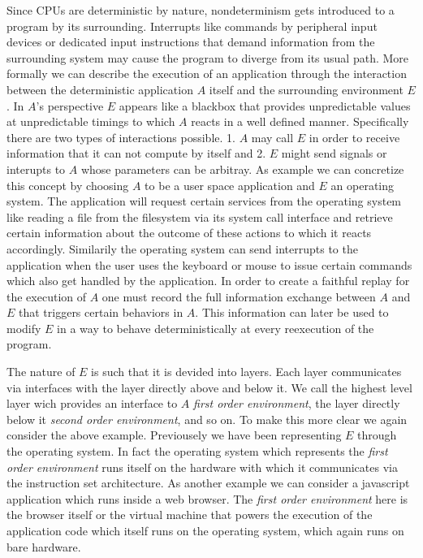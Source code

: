 \documentclass[11pt,a4paper]{book}
\begin{document}
Since CPUs are deterministic by nature, nondeterminism gets introduced to a
program by its surrounding. Interrupts like commands by peripheral input
devices or dedicated input instructions that demand information from the
surrounding system may cause the program to diverge from its usual path.
More formally we can describe the execution of an application through the
interaction between the deterministic application $A$ itself and the surrounding
environment $E$. In $A$'s perspective $E$ appears like a blackbox that
provides unpredictable values at unpredictable timings to which $A$ reacts
in a well defined manner. Specifically there are two types of interactions
possible. 1. $A$ may call $E$ in order to receive information that it can
not compute by itself and 2. $E$ might send signals or interupts to $A$
whose parameters can be arbitray. As example we can concretize this concept
by choosing $A$ to be a user space application and $E$ an operating system.
The application will request certain services from the operating system like
reading a file from the filesystem via its system call interface and retrieve
certain information about the outcome of these actions to which it reacts
accordingly. Similarily the operating system can send interrupts to the
application when the user uses the keyboard or mouse to issue certain commands
which also get handled by the application. In order to create a faithful
replay for the execution of $A$ one must record the full information exchange
between $A$ and $E$ that triggers certain behaviors in $A$. This information
can later be used to modify $E$ in a way to behave deterministically at
every reexecution of the program.

The nature of $E$ is such that
it is devided into layers. Each layer communicates via interfaces with the
layer directly above and below it. We call the highest level layer wich
provides an interface to $A$ \textit{first order environment}, the layer
directly below it \textit{second order environment}, and so on. To make this
more clear we again consider the above example. Previousely we have been
representing $E$ through the operating system. In fact the operating system
which represents the \textit{first order environment} runs itself on the
hardware with which it communicates via the instruction set architecture.
As another example we can consider a javascript application which runs
inside a web browser. The \textit{first order environment} here is the
browser itself or the virtual machine that powers the execution of the
application code which itself runs on the operating system, which again
runs on bare hardware.
\end{document}
